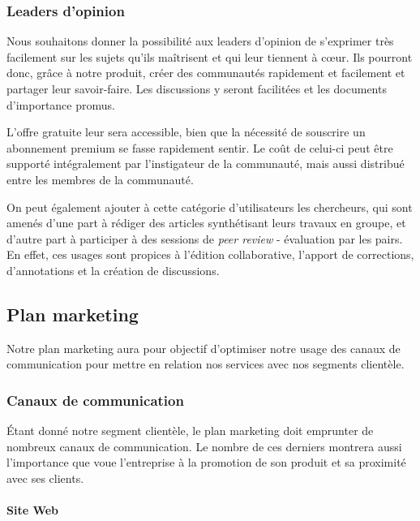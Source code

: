 \documentclass[10pt,twocolumn,a4paper,utf8x]{article}
\begin{document}
\subsubsection{Leaders d'opinion}

Nous souhaitons donner la possibilité aux leaders d'opinion de
s'exprimer très facilement sur les sujets qu'ils maîtrisent et qui leur
tiennent à cœur. Ils pourront donc, grâce à notre produit, créer des
communautés rapidement et facilement et partager leur savoir-faire. Les
discussions y seront facilitées et les documents d'importance promus.

L'offre gratuite leur sera accessible, bien que la nécessité de
souscrire un abonnement premium se fasse rapidement sentir. Le coût de
celui-ci peut être supporté intégralement par l'instigateur de la
communauté, mais aussi distribué entre les membres de la communauté.

On peut également ajouter à cette catégorie d'utilisateurs les
chercheurs, qui sont amenés d'une part à rédiger des articles
synthétisant leurs travaux en groupe, et d'autre part à participer à des
sessions de \emph{peer review} - évaluation par les pairs. En effet, ces
usages sont propices à l'édition collaborative, l'apport de corrections,
d'annotations et la création de discussions.

\subsection{Plan marketing}

Notre plan marketing aura pour objectif d'optimiser notre usage des
canaux de communication pour mettre en relation nos services avec nos
segments clientèle.

\subsubsection{Canaux de communication}

Étant donné notre segment clientèle, le plan marketing doit emprunter de
nombreux canaux de communication. Le nombre de ces derniers montrera
aussi l'importance que voue l'entreprise à la promotion de son produit
et sa proximité avec ses clients.

\paragraph{Site Web}
\end{document}
